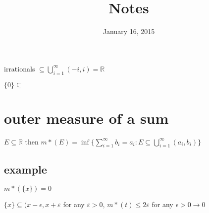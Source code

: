\documentclass[letterpaper]{article}
\begin{document}
\title{Notes}
\date{January 16, 2015}
\maketitle
irrationals $\subseteq\bigcup_{i=1}^\infty(-i,i)=\mathbb{R}$

$\{0\}\subseteq$

\section*{outer measure of a sum}
$E\subseteq\mathbb{R}$ then $m*(E)=\inf\{\sum\limits_{i=1}^\infty{b_i=a_i}:E\subseteq\bigcup_{i=1}^{\infty}(a_i,b_i)\}$

\subsection*{example}
$m*(\{x\})=0$

$\{x\}\subseteq(x-\epsilon,x+\varepsilon$ for any $\varepsilon>0$, $m*(t)\le 2\varepsilon$ for any $\epsilon>0\to 0$
\end{document}
